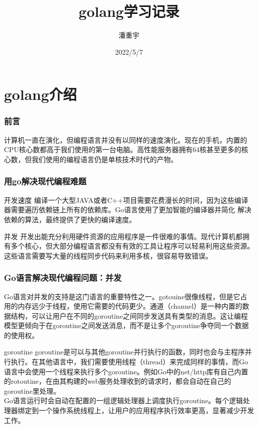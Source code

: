 \documentclass{beamer}
\title{golang学习记录}
\author{潘重宇}
\institute{兴业数金}
\date{2022/5/7}
\begin{document}
	
	\frame{\titlepage}
	
	
	\section{golang介绍}
	\begin{frame}
		\frametitle{前言}
		\quad
		计算机一直在演化，但编程语言并没有以同样的速度演化。现在的手机，内置的CPU核心数都高于我们使用的第一台电脑。高性能服务器拥有64核甚至更多的核心数，但我们使用的编程语言仍是单核技术时代的产物。
	\end{frame}
	
	\begin{frame}
		\frametitle{用go解决现代编程难题}
		\begin{block}{开发速度}
			编译一个大型JAVA或者C++项目需要花费漫长的时间，因为这些编译器需要遍历依赖链上所有的依赖库。Go语言使用了更加智能的编译器并简化 解决依赖的算法，最终提供了更快的编译速度。
		\end{block}
		\begin{block}{并发}
			开发出能充分利用硬件资源的应用程序是一件很难的事情。现代计算机都拥有多个核心，但大部分编程语言都没有有效的工具让程序可以轻易利用这些资源。这些语言需要写大量的线程同步代码来利用多核，很容易导致错误。
		\end{block}
	\end{frame}
	
	\begin{frame}
		\frametitle{Go语言解决现代编程问题：并发}
		\quad
		Go语言对并发的支持是这门语言的重要特性之一。gotouine很像线程，但是它占用的内存远少于线程，使用它需要的代码更少。通道（channel）是一种内置的数据结构，可以让用户在不同的goroutine之间同步发送具有类型的消息。这让编程模型更倾向于在goroutine之间发送消息，而不是让多个goroutine争夺同一个数据的使用权。
		\begin{block}{goroutine}
			goroutine是可以与其他goroutine并行执行的函数，同时也会与主程序并行执行。在其他语言中，我们需要使用线程（thread）来完成同样的事情，而Go语言中会使用一个线程来执行多个goroutine。例如Go中的net/http库有自己内置的rotoutine，在由其构建的web服务处理收到的请求时，都会自动在自己的goroutine里处理。\\
			Go语言运行时会自动在配置的一组逻辑处理器上调度执行goroutine。每个逻辑处理器绑定到一个操作系统线程上，让用户的应用程序执行效率更高，显著减少开发工作。
		\end{block}
	\end{frame}
	
\end{document}
